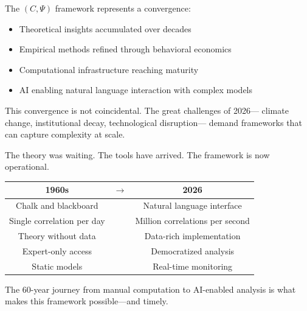 The $(C, \Psi)$ framework represents a convergence:
\begin{itemize}
  \item Theoretical insights accumulated over decades
  \item Empirical methods refined through behavioral economics
  \item Computational infrastructure reaching maturity
  \item AI enabling natural language interaction with complex models
\end{itemize}

This convergence is not coincidental. The great challenges of 2026---
climate change, institutional decay, technological disruption---
demand frameworks that can capture complexity at scale.

The theory was waiting. The tools have arrived.
The framework is now operational.

\begin{center}
\renewcommand{\arraystretch}{1.3}
\begin{tabular}{ccc}
\hline
\textbf{1960s} & $\longrightarrow$ & \textbf{2026} \\
\hline
Chalk and blackboard & & Natural language interface \\
Single correlation per day & & Million correlations per second \\
Theory without data & & Data-rich implementation \\
Expert-only access & & Democratized analysis \\
Static models & & Real-time monitoring \\
\hline
\end{tabular}
\end{center}

The 60-year journey from manual computation to AI-enabled analysis
is what makes this framework possible---and timely.

